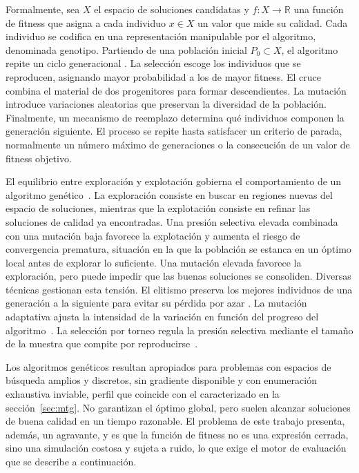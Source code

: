 Formalmente, sea $X$ el espacio de soluciones candidatas y $f: X \rightarrow \mathbb{R}$ una función de fitness que asigna a cada individuo $x \in X$ un valor que mide su calidad. Cada individuo se codifica en una representación manipulable por el algoritmo, denominada genotipo. Partiendo de una población inicial $P_0 \subset X$, el algoritmo repite un ciclo generacional \cite{eiben2015}. La selección escoge los individuos que se reproducen, asignando mayor probabilidad a los de mayor fitness. El cruce combina el material de dos progenitores para formar descendientes. La mutación introduce variaciones aleatorias que preservan la diversidad de la población. Finalmente, un mecanismo de reemplazo determina qué individuos componen la generación siguiente. El proceso se repite hasta satisfacer un criterio de parada, normalmente un número máximo de generaciones o la consecución de un valor de fitness objetivo.

El equilibrio entre exploración y explotación gobierna el comportamiento de un algoritmo genético~\cite{crepinsek2013}. La exploración consiste en buscar en regiones nuevas del espacio de soluciones, mientras que la explotación consiste en refinar las soluciones de calidad ya encontradas. Una presión selectiva elevada combinada con una mutación baja favorece la explotación y aumenta el riesgo de convergencia prematura, situación en la que la población se estanca en un óptimo local antes de explorar lo suficiente. Una mutación elevada favorece la exploración, pero puede impedir que las buenas soluciones se consoliden. Diversas técnicas gestionan esta tensión. El elitismo preserva los mejores individuos de una generación a la siguiente para evitar su pérdida por azar \cite{mitchell1996}. La mutación adaptativa ajusta la intensidad de la variación en función del progreso del algoritmo~\cite{eiben1999}. La selección por torneo regula la presión selectiva mediante el tamaño de la muestra que compite por reproducirse~\cite{millergoldberg1995}.

Los algoritmos genéticos resultan apropiados para problemas con espacios de búsqueda amplios y discretos, sin gradiente disponible y con enumeración exhaustiva inviable, perfil que coincide con el caracterizado en la sección~\ref{sec:mtg}. No garantizan el óptimo global, pero suelen alcanzar soluciones de buena calidad en un tiempo razonable. El problema de este trabajo presenta, además, un agravante, y es que la función de fitness no es una expresión cerrada, sino una simulación costosa y sujeta a ruido, lo que exige el motor de evaluación que se describe a continuación.

